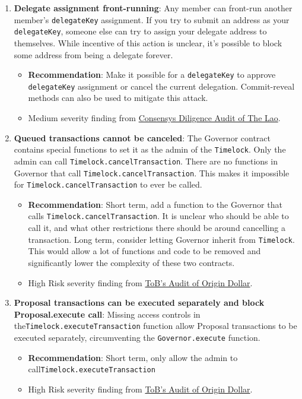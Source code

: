 \begin{enumerate}
\item\textbf{Delegate assignment front-running}: Any member can front-run another member’s \verb|delegateKey| assignment. If you try to submit an address as your \verb|delegateKey|, someone else can try to assign your delegate address to themselves. While incentive of this action is unclear, it’s possible to block some address from being a delegate forever.
	\begin{itemize}
	\item\textbf{Recommendation}: Make it possible for a \verb|delegateKey| to approve \verb|delegateKey| assignment or cancel the current delegation. Commit-reveal methods can also be used to mitigate this attack.
	\item Medium severity finding from \href{https://consensys.net/diligence/audits/2020/01/the-lao}{Consensys Diligence Audit of The Lao}.
	\end{itemize}

\item\textbf{Queued transactions cannot be canceled}: The Governor contract contains special functions to set it as the admin of the \verb|Timelock|. Only the admin can call \verb|Timelock.cancelTransaction|. There are no functions in Governor that call \verb|Timelock.cancelTransaction|. This makes it impossible for \verb|Timelock.cancelTransaction| to ever be called.
	\begin{itemize}
	\item\textbf{Recommendation}: Short term, add a function to the Governor that calls \verb|Timelock.cancelTransaction|. It is unclear who should be able to call it, and what other restrictions there should be around cancelling a transaction. Long term, consider letting Governor inherit from \verb|Timelock|. This would allow a lot of functions and code to be removed and significantly lower the complexity of these two contracts.
	\item High Risk severity finding from \href{https://github.com/trailofbits/publications/blob/master/reviews/OriginDollar.pdf}{ToB’s Audit of Origin Dollar}.
	\end{itemize}

\item\textbf{Proposal transactions can be executed separately and block Proposal.execute call}: Missing access controls in the\linebreak\verb|Timelock.executeTransaction| function allow Proposal transactions to be executed separately, circumventing the \verb|Governor.execute| function.
	\begin{itemize}
	\item\textbf{Recommendation}: Short term, only allow the admin to call\linebreak\verb|Timelock.executeTransaction|
	\item High Risk severity finding from \href{https://github.com/trailofbits/publications/blob/master/reviews/OriginDollar.pdf}{ToB’s Audit of Origin Dollar}.
	\end{itemize}


\end{enumerate}
